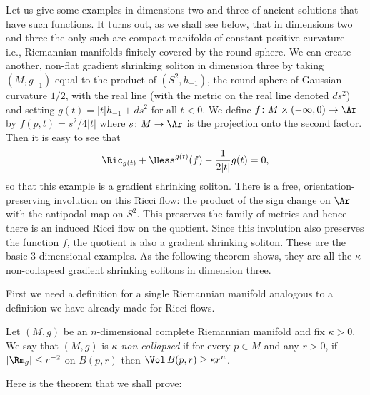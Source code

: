  Let us give some examples in
dimensions two and three of ancient solutions that have such
functions. It turns out, as we shall see below, that in dimensions
two and three the only such are compact manifolds of constant
positive curvature -- i.e., Riemannian manifolds finitely covered by
the round sphere. We can create another, non-flat gradient shrinking
soliton in dimension three by taking $(M,g_{-1})$ equal to the
product of $(S^2,h_{-1})$, the round sphere of Gaussian curvature
$1/2$, with the real line (with the metric on the real line denoted
$ds^{ 2}$) and setting $g(t)=|t|h_{-1}+ ds^2$ for all $t<0$. We
define $f\colon M\times (-\infty,0)\to\Ar$ by $f(p,t)=s^2/4|t|$
where $s\colon M\to \Ar$ is the projection onto the second factor.
Then it is easy to see that
$$\Ric_{g(t)}+\Hess^{g(t)}(f)-\frac{1}{2|t|}g(t)=0,$$
so that this example is a gradient shrinking soliton. There is a
free, orientation-preserving involution on this Ricci flow: the
product of the sign change on $\Ar$ with the antipodal map on $S^2$.
This preserves the family of metrics and hence there is an induced
Ricci flow on the quotient. Since this involution also preserves the
function $f$, the quotient  is also a gradient shrinking soliton.
These are the basic $3$-dimensional examples. As the following
theorem shows, they are all the $\kappa$-non-collapsed gradient
shrinking solitons in dimension three.

First we need a definition for a single Riemannian manifold analogous to a
definition we have already made for Ricci flows.

\begin{definition}\label{def:kappa-noncollapsed-riemannian-manifold}
Let $(M,g)$ be an $n$-dimensional complete Riemannian manifold and
fix $\kappa>0$. We say that $(M,g)$ is {\em $\kappa$-non-collapsed}
if for every $p\in M$ and any $r>0$, if $|\Rm_g|\le r^{-2}$ on
$B(p,r)$ then $\Vol\, B(p,r)\ge \kappa r^n$.
\end{definition}


Here is the theorem that we shall prove:

